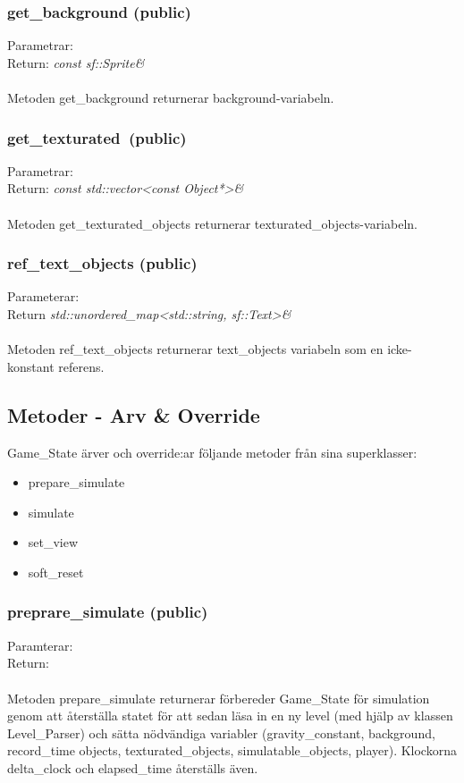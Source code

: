 \documentclass{TDP003mall}
\begin{document}
\subsubsection{get\_background (public)}
Parametrar: \textit{}
\\Return: \textit{const sf::Sprite\&}
\\\\
Metoden get\_background returnerar background-variabeln.

\subsubsection{get\_texturated\ (public)}
Parametrar: \textit{}
\\Return: \textit{const std::vector<const Object*>\&}
\\\\
Metoden get\_texturated\_objects returnerar texturated\_objects-variabeln.

\subsubsection{ref\_text\_objects (public)}
Parameterar: \textit{}
\\Return \textit{std::unordered\_map<std::string, sf::Text>&}
\\\\
Metoden ref\_text\_objects returnerar text\_objects variabeln som en icke-konstant referens.

\subsection{Metoder - Arv \& Override}
Game\_State ärver och override:ar följande metoder från sina superklasser:
\begin{itemize}
\item prepare\_simulate
\item simulate
\item set\_view
\item soft\_reset
\end{itemize}

\subsubsection{preprare\_simulate (public)}
Paramterar: \textit{}
\\Return: \textit{}
\\\\
Metoden prepare\_simulate returnerar förbereder Game\_State för simulation genom att återställa statet för att sedan läsa in en ny level (med hjälp av klassen Level\_Parser) och sätta nödvändiga variabler (gravity\_constant, background, record\_time objects, texturated\_objects, simulatable\_objects, player). Klockorna delta\_clock och elapsed\_time återställs även.
\\\\
\end{document}
